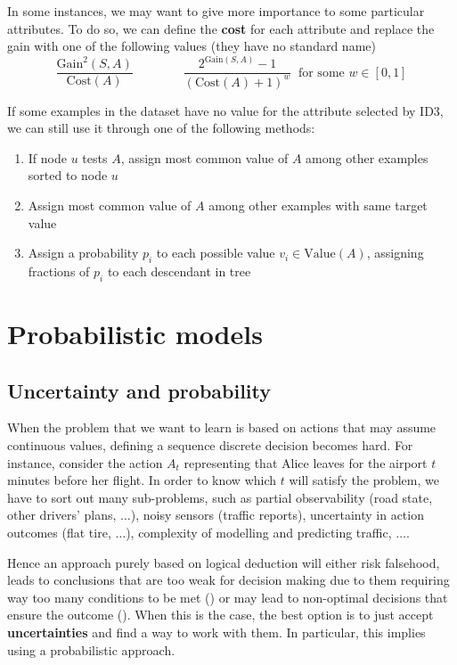 \documentclass[a4paper, 12pt]{report}
\begin{document}
    In some instances, we may want to give more importance to some particular attributes. To do so, we can define the \textbf{cost} for each attribute and replace the gain with one of the following values (they have no standard name)
    \[\frac{\mathrm{Gain}^2(S,A)}{\mathrm{Cost}(A)} \qquad\qquad \frac{2^{\mathrm{Gain}(S,A)}-1}{(\mathrm{Cost}(A)+1)^w} \;\; \text{for some $w \in [0,1]$}\]

    If some examples in the dataset have no value for the attribute selected by ID3, we can still use it through one of the following methods:
    \begin{enumerate}
        \item If node $u$ tests $A$, assign most common value of $A$ among other
        examples sorted to node $u$
        \item Assign most common value of $A$ among other examples with same
        target value
        \item Assign a probability $p_i$ to each possible value $v_i \in \mathrm{Value}(A)$, assigning fractions of $p_i$ to each descendant in tree
    \end{enumerate}

    \newpage

    \chapter{Probabilistic models}

    \section{Uncertainty and probability}

    When the problem that we want to learn is based on actions that may assume continuous values, defining a sequence discrete decision becomes hard. For instance, consider the action $A_t$ representing that Alice leaves for the airport $t$ minutes before her flight. In order to know which $t$ will satisfy the problem, we have to sort out many sub-problems, such as partial observability (road state, other drivers' plans, $\ldots$), noisy sensors (traffic reports), uncertainty in action outcomes (flat tire, $\ldots$), complexity of modelling and predicting traffic, $\ldots$.
    
    Hence an approach purely based on logical deduction will either risk falsehood, leads to conclusions that are too weak for decision making due to them requiring way too many conditions to be met () or may lead to non-optimal decisions that ensure the outcome (). When this is the case, the best option is to just accept \textbf{uncertainties} and find a way to work with them. In particular, this implies using a probabilistic approach.
\end{document}
